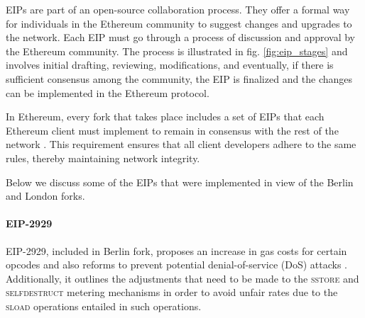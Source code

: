 EIPs are part of an open-source collaboration process. They offer a formal way for individuals in the Ethereum community to suggest changes and upgrades to the network. Each EIP must go through a process of discussion and approval by the Ethereum community. The process is illustrated in fig. \ref{fig:eip_stages} and involves initial drafting, reviewing, modifications, and eventually, if there is sufficient consensus among the community, the EIP is finalized and the changes can be implemented in the Ethereum protocol. 


In Ethereum, every fork that takes place includes a set of EIPs that each Ethereum client must implement to remain in consensus with the rest of the network \citep{ethereumfoundation_2023a}. This requirement ensures that all client developers adhere to the same rules, thereby maintaining network integrity.

Below we discuss some of the EIPs that were implemented in view of the Berlin and London forks.

\paragraph{EIP-2929}\label{par:eip_2929_cold_warm}

EIP-2929, included in Berlin fork, proposes an increase in gas costs for certain opcodes and also reforms  to prevent potential denial-of-service (DoS) attacks \citep{buterin_eip_2929}. Additionally, it outlines the adjustments that need to be made to the \textsc{sstore} and \textsc{selfdestruct} metering mechanisms in order to avoid unfair rates due to the \textsc{sload} operations entailed in such operations.

